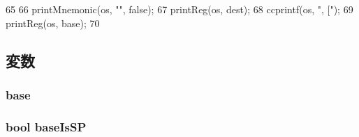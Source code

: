 \begin{DoxyCode}
65 {
66     printMnemonic(os, "", false);
67     printReg(os, dest);
68     ccprintf(os, ", [");
69     printReg(os, base);
70 }
\end{DoxyCode}


\subsection{変数}
\hypertarget{classArmISA_1_1Memory64_ad7a926fdfe0820284d654e9139a423b2}{
\subsubsection[{base}]{ {\bf base}}}
\label{classArmISA_1_1Memory64_ad7a926fdfe0820284d654e9139a423b2}
\hypertarget{classArmISA_1_1Memory64_a3993b505387debb1b0d8c46006c99ab0}{
\subsubsection[{baseIsSP}]{\setlength{\rightskip}{0pt plus 5cm}bool {\bf baseIsSP}}}
\label{classArmISA_1_1Memory64_a3993b505387debb1b0d8c46006c99ab0}


